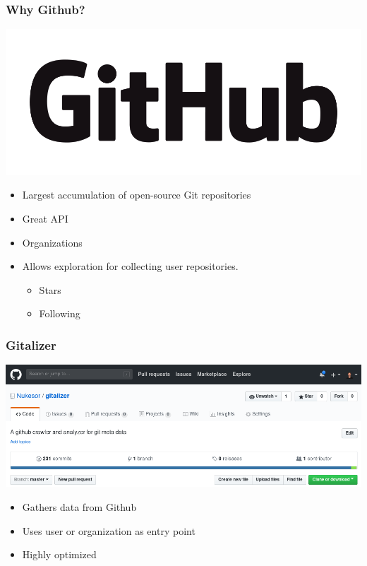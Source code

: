 \documentclass[t]{beamer}
\begin{document}
\begin{frame}
    \frametitle{Why Github?}
    \begin{center}
        \includegraphics[scale=0.12]{./pic/github-logo.png}
    \end{center}

    \begin{itemize}
        \item Largest accumulation of open-source Git repositories
        \pause{}
        \item Great API
        \pause{}
        \item Organizations
        \pause{}
        \item Allows exploration for collecting user repositories.
        \begin{itemize}
            \item Stars
            \item Following
        \end{itemize}
    \end{itemize}
\end{frame}

\begin{frame}
    \frametitle{Gitalizer}
    \begin{center}
        \includegraphics[scale=0.30]{./pic/gitalizer-github.png}
    \end{center}

    \begin{itemize}
        \item Gathers data from Github
        \item Uses user or organization as entry point
        \item Highly optimized
    \end{itemize}
\end{frame}
\end{document}
